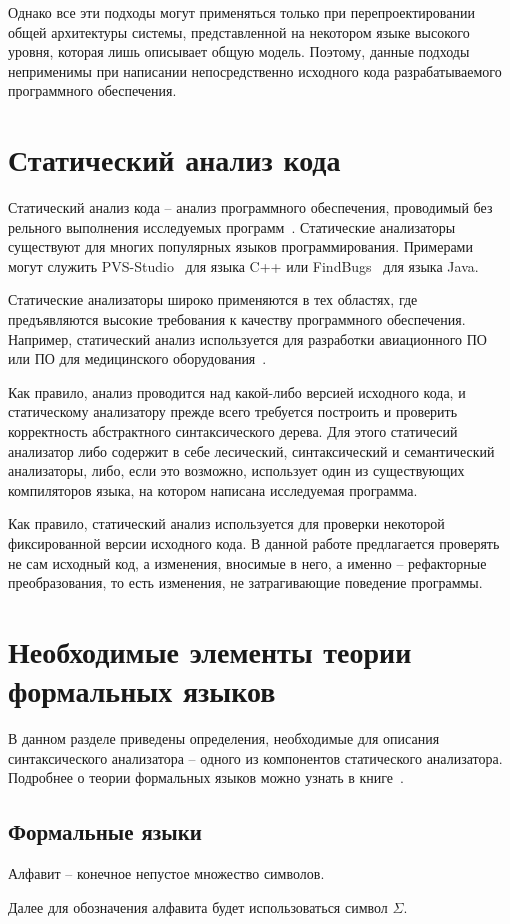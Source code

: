 Однако все эти подходы могут применяться только при перепроектировании общей архитектуры системы,
представленной на некотором языке высокого уровня, которая лишь описывает общую модель.
Поэтому, данные подходы неприменимы при написании непосредственно исходного кода разрабатываемого программного обеспечения.

\section{Статический анализ кода}
Статический анализ кода -- анализ программного обеспечения, проводимый без рельного выполнения исследуемых программ~\cite{Wichmann95industrialperspective}.
Статические анализаторы существуют для многих популярных языков программирования.
Примерами могут служить PVS-Studio~\cite{pvs-studio} для языка C++ или FindBugs~\cite{findbugs} для языка Java.

Статические анализаторы широко применяются в тех областях, где предъявляются высокие требования к качеству программного обеспечения.
Например, статический анализ используется для разработки авиационного ПО~\cite{static-air} или ПО для медицинского оборудования~\cite{static-med}.


Как правило, анализ проводится над какой-либо версией исходного кода,
и статическому анализатору прежде всего требуется построить и проверить корректность абстрактного синтаксического дерева.
Для этого статичесий анализатор либо содержит в себе лесический, синтаксический и семантический анализаторы,
либо, если это возможно, использует один из существующих компиляторов языка, на котором написана исследуемая программа.

Как правило, статический анализ используется для проверки некоторой фиксированной версии исходного кода.
В данной работе предлагается проверять не сам исходный код, а изменения, вносимые в него,
а именно -- рефакторные преобразования, то есть изменения, не затрагивающие поведение программы.
\section{Необходимые элементы теории формальных языков}
В данном разделе приведены определения, необходимые для описания синтаксического анализатора -- одного из компонентов статического анализатора.
Подробнее о теории формальных языков можно узнать в книге~\cite{hmu}.
\subsection{Формальные языки}
\begin{definition}
Алфавит -- конечное непустое множество символов.
\end{definition}
Далее для обозначения алфавита будет использоваться символ $\Sigma$.

